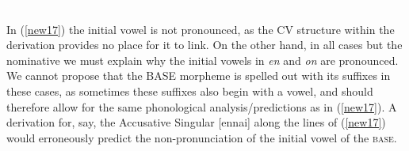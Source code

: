 \documentclass[output=paper,colorlinks,citecolor=brown,
]{langscibook}
\begin{document}
\begin{multicols}{3}
\begin{exe}
\ex \label{new17} 

\vfill \null
\columnbreak
 {\textcolor{white}{.}} \\
\rightarrow 
 
\vfill \null
\columnbreak


\end{exe}
\end{multicols}


In (\ref{new17}) the initial vowel is not pronounced, as the CV structure within the derivation provides no place for it to link. On the other hand, in all cases but the nominative we must explain why the initial vowels in \textit{en} and \textit{on} are pronounced. We cannot propose that the BASE morpheme is spelled out with its suffixes in these cases, as sometimes these suffixes also begin with a vowel, and should therefore allow for the same phonological analysis/predictions as in (\ref{new17}). A derivation for, say, the Accusative Singular [ennai] along the lines of (\ref{new17}) would erroneously predict the non-pronunciation of the initial vowel of the \textsc{base}.
\end{document}
